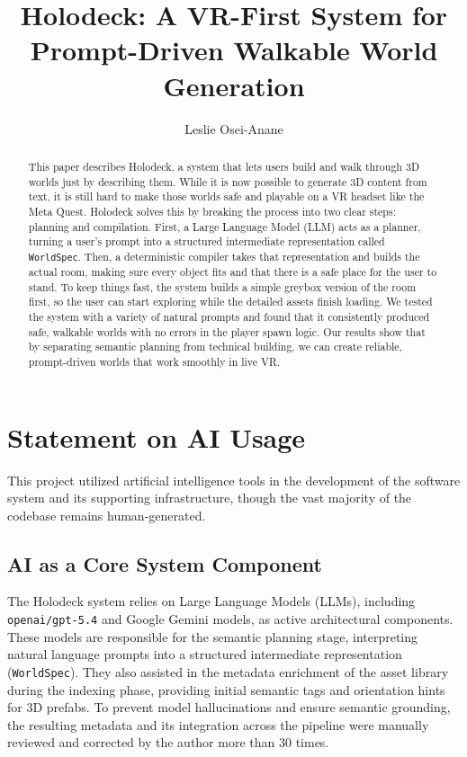 \documentclass[12pt]{article}
\title{\textbf{Holodeck: A VR-First System for Prompt-Driven Walkable World Generation}}
\author{Leslie Osei-Anane}
\begin{document}
\maketitle

\begin{abstract}
This paper describes Holodeck, a system that lets users build and walk through 3D worlds just by describing them. While it is now possible to generate 3D content from text, it is still hard to make those worlds safe and playable on a VR headset like the Meta Quest. Holodeck solves this by breaking the process into two clear steps: planning and compilation. First, a Large Language Model (LLM) acts as a planner, turning a user's prompt into a structured intermediate representation called \texttt{WorldSpec}. Then, a deterministic compiler takes that representation and builds the actual room, making sure every object fits and that there is a safe place for the user to stand. To keep things fast, the system builds a simple greybox version of the room first, so the user can start exploring while the detailed assets finish loading. We tested the system with a variety of natural prompts and found that it consistently produced safe, walkable worlds with no errors in the player spawn logic. Our results show that by separating semantic planning from technical building, we can create reliable, prompt-driven worlds that work smoothly in live VR.
\end{abstract}

\newpage
\tableofcontents
\newpage

\section*{Statement on AI Usage}
This project utilized artificial intelligence tools in the development of the software system and its supporting infrastructure, though the vast majority of the codebase remains human-generated.

\subsection*{AI as a Core System Component}
The Holodeck system relies on Large Language Models (LLMs), including \texttt{openai/gpt-5.4} and Google Gemini models, as active architectural components. These models are responsible for the semantic planning stage, interpreting natural language prompts into a structured intermediate representation (\texttt{WorldSpec}). They also assisted in the metadata enrichment of the asset library during the indexing phase, providing initial semantic tags and orientation hints for 3D prefabs. To prevent model hallucinations and ensure semantic grounding, the resulting metadata and its integration across the pipeline were manually reviewed and corrected by the author more than 30 times.
\end{document}
